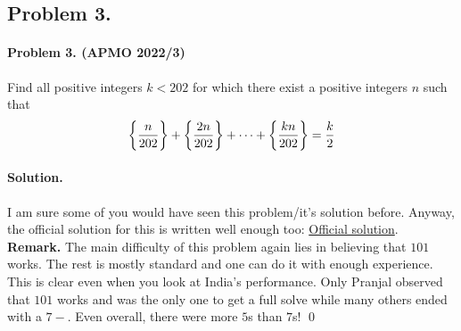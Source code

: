 \documentclass[12pt]{article}
\newenvironment{solution}
{\paragraph{Solution.}}
{\qed\eject}
\begin{document}
\subsection*{Problem 3.}

\paragraph*{\textbf{Problem 3. (APMO 2022/3)}} Find all positive integers $k<202$ for which there exist a positive integers $n$ such that
\[\bigg {\{}\frac{n}{202}\bigg {\}}+\bigg {\{}\frac{2n}{202}\bigg {\}}+\cdots +\bigg {\{}\frac{kn}{202}\bigg {\}}=\frac{k}{2}\]
\begin{solution}
    I am sure some of you would have seen this problem/it's solution before. Anyway, the official solution for this is written well enough too: \href{https://www.apmo-official.org/static/solutions/apmo2022_sol.pdf}{Official solution}.\\

    \textbf{Remark.} The main difficulty of this problem again lies in believing that $101$ works. The rest is mostly standard and one can do it with enough experience. This is clear even when you look at India's performance. Only Pranjal observed that $101$ works and was the only one to get a full solve while many others ended with a $7-$. Even overall, there were more $5$s than $7$s!
\end{solution}
\end{document}

